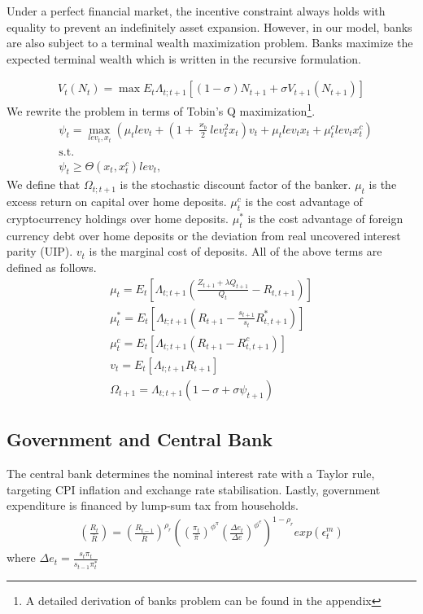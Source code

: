 \documentclass[12pt, a4paper]{article}
\begin{document}
 Under a perfect financial market, the incentive constraint always holds with equality to prevent an indefinitely asset expansion. However, in our model, banks are also subject to a terminal wealth maximization problem. Banks maximize the expected terminal wealth which is written in the recursive formulation.

\begin{align}
   V_t(N_t)= \max E_{t}\Lambda_{t;t+1}[ (1-\sigma)N_{t+1}+\sigma V_{t+1}(N_{t+1})]
\end{align}
We rewrite the problem in terms of Tobin's Q maximization\footnote{A detailed derivation of banks problem can be found in the appendix}.
\begin{align}
    & \psi_t = \max_{lev_t, x_t}\left(\mu_t lev_t  +\left(1+\frac{\varkappa_{b}}{2}lev_t^2 x_t \right)v_t +\mu_t lev_t x_t + \mu^c_t lev_t x^c_t \right)\\
    &\text{s.t.} \quad \nonumber \\
    &\psi_t  \geq \Theta(x_t, x^c_t)lev_t,
\end{align}
We define that  $\Omega_{t;t+1}$ is the stochastic discount factor of the banker. $\mu_t$  is the excess return
on capital over home deposits. $\mu^c_t$ is the cost advantage of cryptocurrency holdings over home deposits. $\mu^*_t$ is the cost advantage of foreign currency debt over home deposits or the deviation from real uncovered interest parity (UIP). $v_t$ is the marginal cost of deposits. All of the above terms are defined as follows.
\begin{align}
\mu_t=E_t\left[\Lambda_{t;t+1}\left(\frac{Z_{t+1}+\lambda Q_{t+1}}{Q_t} -R_{t,t+1} \right)\right] \\
\mu^*_t=E_t\left[\Lambda_{t;t+1}\left(R_{t+1} - \frac{s_{t+1}}{s_t}R^*_{t,t+1} \right)\right] \\
\mu^c_t=E_t\left[\Lambda_{t;t+1}\left(R_{t+1} - R^c_{t,t+1} \right)\right] \\
v_t=E_t\left[\Lambda_{t;t+1} R_{t+1}\right] \\
\Omega_{t+1} = \Lambda_{t;t+1}(1-\sigma + \sigma \psi_{t+1}) 
\end{align}



\subsection{Government and Central Bank}
The central bank determines the nominal interest rate with a Taylor rule, targeting CPI inflation and exchange rate stabilisation. Lastly, government expenditure is financed by lump-sum tax from households.
\begin{align}
    \left(\frac{{{R}_{t}}}{{\bar R}}\right)=  \left(\frac{{{R}_{t-1}}}{{\bar R}}\right)^{\rho_r} \left(\left(\frac{\pi_t}{\bar \pi}\right)^{\phi^\pi} \left(\frac{\Delta e_t}{\Delta e}\right)^{\phi^e}\right)^{1-\rho_r} exp(\epsilon^m_{t})
\end{align}
where $\Delta e_t = \frac{s_t\pi_t}{s_{t-1}\pi_t^*}$
\end{document}

